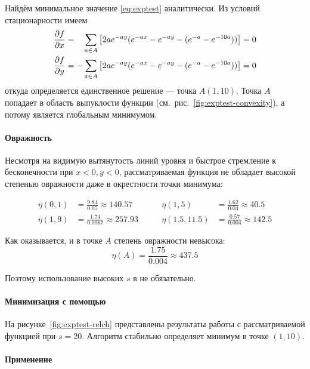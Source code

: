 Найдём минимальное значение \eqref{eq:exptest} аналитически. Из
условий стационарности имеем
\begin{equation*}
  \begin{aligned}
    \pardiff{f}{x} &=\phm\suml_{a\in A}\left[2ae^{-ay}(e^{-ax}-e^{-ay}-(e^{-a}-e^{-10a}))\right] = 0\\
    \pardiff{f}{y} &=-\suml_{a\in A}\left[2ae^{-ay}(e^{-ax}-e^{-ay}-(e^{-a}-e^{-10a}))\right] = 0
  \end{aligned}
\end{equation*}
откуда определяется единственное решение — точка $A (1,10)$. Точка $A$
попадает в область выпуклости функции
(см. рис. \ref{fig:exptest-convexity}), а потому является глобальным
минимумом.

\paragraph{Овражность}

Несмотря на видимую вытянутость линий уровня и быстрое стремление к
бесконечности при $x<0,y<0$, рассматриваемая функция не обладает
высокой степенью овражности даже в окрестности точки минимума:

\begin{equation}
  \begin{aligned}
    \eta(0,1) &= \frac{9.84}{0.07} \approx 140.57&\qquad
    \eta(1,5) &= \frac{1.62}{0.04} \approx 40.5\\
    \eta(1,9) &= \frac{1.74}{0.0067} \approx 257.93&\qquad
    \eta(1.5,11.5) &= \frac{0.57}{0.004} \approx 142.5
\end{aligned}
\end{equation}

Как оказывается, и в точке $A$ степень овражности невысока:
\begin{equation*}
  \eta(A) = \frac{1.75}{0.004} \approx 437.5
\end{equation*}

Поэтому использование высоких $s$ в \relch{} не обязательно.

\paragraph{Минимизация с помощью \relch{}}

На рисунке \ref{fig:exptest-relch} представлены результаты работы
\relch{} с рассматриваемой функцией при $s=20$. Алгоритм стабильно
определяет минимум в точке $(1, 10)$.

\paragraph{Применение \gdrelch{}}

